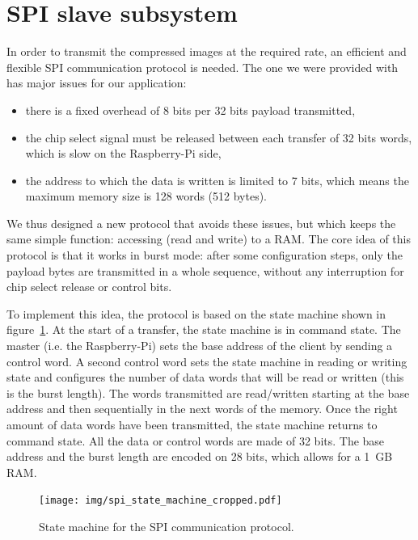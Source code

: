 \documentclass[english, DIV=13]{scrreprt}
\begin{document}
\section{SPI slave subsystem}
\label{sec:spi}

In order to transmit the compressed images at the required rate, an efficient and
flexible SPI communication protocol is needed.
The one we were provided with has major issues for our application:
\begin{itemize}
    \item there is a fixed overhead of 8 bits per 32 bits payload transmitted,
    \item the chip select signal must be released between each transfer of 32 bits
    words, which is slow on the Raspberry-Pi side,
    \item the address to which the data is written is limited to 7 bits, which means
    the maximum memory size is 128 words (512 bytes).
\end{itemize}

We thus designed a new protocol that avoids these issues, but which keeps the same simple
function: accessing (read and write) to a RAM.
The core idea of this protocol is that it works in burst mode: after some configuration
steps,
only the payload bytes are transmitted in a whole sequence, without any interruption for
chip select release or control bits.

To implement this idea, the protocol is based on the state machine shown in
figure~\ref{fig:spi}.
At the start of a transfer, the state machine is in command state.
The master (i.e. the Raspberry-Pi) sets the base address of the client by
sending a control word. A second control word sets the state machine in reading or
writing state and configures the number of data words that will be read or written
(this is the burst length).
The words transmitted are read/written starting at the base address and then sequentially
in the next words of the memory.
Once the right amount of data words have been transmitted, the state machine returns to
command state.
All the data or control words are made of 32 bits. The base address and the burst length
are encoded on 28 bits, which allows for a \SI{1}{GB} RAM.

\begin{figure}[bth]
    \centering
    \texttt{[image: img/spi\_state\_machine\_cropped.pdf]}
    \caption{State machine for the SPI communication protocol.}
    \label{fig:spi}
\end{figure}
\end{document}
